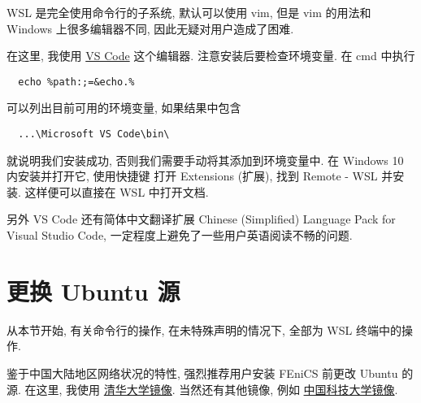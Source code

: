 \documentclass[fontset=founder]{ctexrep}
\begin{document}
WSL 是完全使用命令行的子系统,
默认可以使用 vim,
但是 vim 的用法和 Windows 上很多编辑器不同,
因此无疑对用户造成了困难.

在这里,
我使用
\href{https://code.visualstudio.com/}{VS Code}
这个编辑器.
注意安装后要检查环境变量.
在 \textsf{cmd} 中执行
\begin{lstlisting}
  echo %path:;=&echo.%
\end{lstlisting}
可以列出目前可用的环境变量,
如果结果中包含
\begin{lstlisting}
  ...\Microsoft VS Code\bin\
\end{lstlisting}
就说明我们安装成功,
否则我们需要手动将其添加到环境变量中.
在 Windows 10 内安装并打开它,
使用快捷键  打开 \textsf{Extensions (扩展)},
找到 \textsf{Remote - WSL} 并安装.
这样便可以直接在 WSL 中打开文档.

另外 VS Code 还有简体中文翻译扩展 \textsf{Chinese (Simplified) Language Pack for Visual Studio Code},
一定程度上避免了一些用户英语阅读不畅的问题.

\section{更换 Ubuntu 源}\label{sec:source}

从本节开始,
有关命令行的操作,
在未特殊声明的情况下,
全部为 WSL 终端中的操作.

鉴于中国大陆地区网络状况的特性,
强烈推荐用户安装 FEniCS 前更改 Ubuntu 的源.
在这里,
我使用%
\href{https://mirrors.tuna.tsinghua.edu.cn/help/ubuntu/}{清华大学镜像}.
当然还有其他镜像,
例如%
\href{https://mirrors.ustc.edu.cn/help/ubuntu.html}{中国科技大学镜像}.
\end{document}
